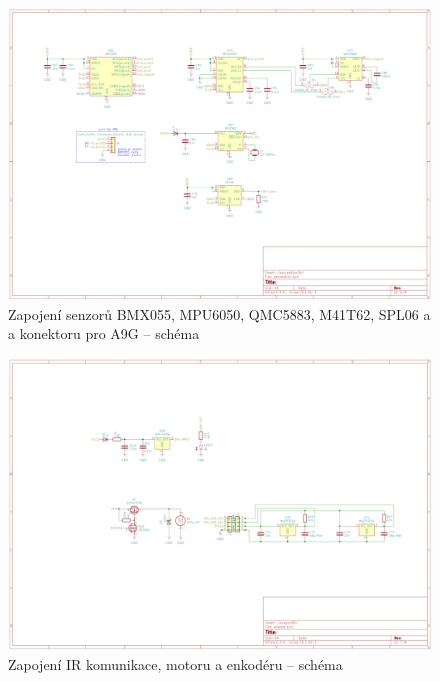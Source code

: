 \begin{figure}[htbp]
    \centering
    \includegraphics[width=\textwidth]{kapitoly/ctvrta_elektronicka_varianta/E4_zapojeni/senzorika.pdf}
    \caption{Zapojení senzorů BMX055, MPU6050, QMC5883, M41T62, SPL06 a a konektoru pro A9G -- schéma}
    \label{fig:E4-sch_senzorika}
\end{figure}
\begin{figure}[htbp]
    \centering
    \includegraphics[width=\textwidth]{kapitoly/ctvrta_elektronicka_varianta/E4_zapojeni/IR_motor_enkoder.pdf}
    \caption{Zapojení IR komunikace, motoru a enkodéru -- schéma}
    \label{fig:E4-sch_IR-Motor-enkoder}
\end{figure}
